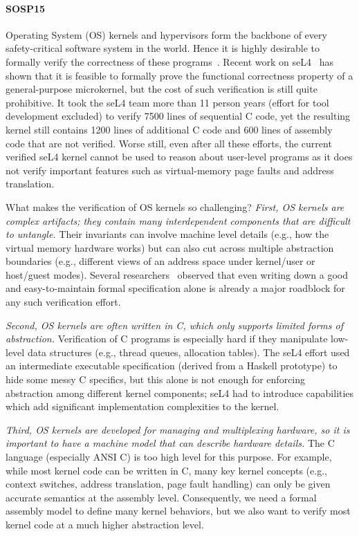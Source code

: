 \paragraph{SOSP15}

Operating System (OS) kernels and hypervisors form the backbone of
every safety-critical software system in the world.  Hence it is highly
desirable to formally verify the correctness of these
programs~\cite{shao10}.  
Recent work on seL4~\cite{klein2009sel4,klein14} has shown that it is
feasible to formally prove the functional correctness property of a
general-purpose microkernel, but the cost of such verification is
still quite prohibitive. It took the seL4 team more than 11 person
years (effort for tool development excluded) to verify 7500 lines of
sequential C code, yet the resulting kernel still contains 1200 lines
of additional C code and 600 lines of assembly code that are not
verified. Worse still, even after all these efforts, the current
verified seL4 kernel cannot be used to reason about user-level
programs as it does not verify important features such as
virtual-memory page faults and address translation.

What makes the verification of OS kernels so challenging?
{\em First, OS kernels are complex artifacts; they contain many
  interdependent components that are difficult to untangle.} Their
invariants can involve machine level details (e.g., how the virtual
memory hardware works) but can also cut across multiple
abstraction boundaries (e.g., different views of an address space
under kernel/user or host/guest modes).  Several
researchers~\cite{baumann12,vaynberg12} observed that even writing
down a good and easy-to-maintain formal specification alone is already
a major roadblock for any such verification effort.

{\em Second, OS kernels are often written in C, which only supports
  limited forms of abstraction.}  Verification of C programs is
especially hard if they manipulate low-level data structures (e.g.,
thread queues, allocation tables).  The seL4 effort used an
intermediate executable specification (derived from a Haskell
prototype) to hide some messy C specifics, but this alone is not
enough for enforcing abstraction among different kernel components;
seL4 had to introduce capabilities which add significant
implementation complexities to the kernel.

{\em Third, OS kernels are developed for managing and multiplexing
  hardware, so it is important to have a machine model that can
  describe hardware details.} The C language (especially ANSI C) is
too high level for this purpose. For example, while most kernel code
can be written in C, many key kernel concepts (e.g., context switches,
address translation, page fault handling) can only be given accurate
semantics at the assembly level. Consequently, we need a formal
assembly model to define many kernel behaviors, but we also want to
verify most kernel code at a much higher abstraction level.

